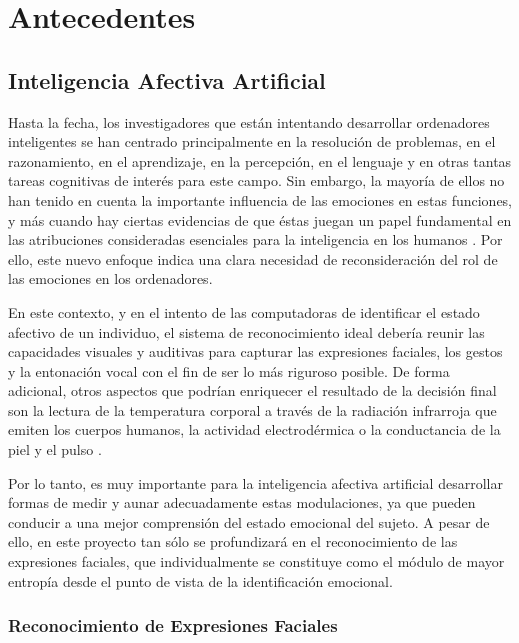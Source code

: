 \chapter{Antecedentes} \label{Chapter:2}

\section{Inteligencia Afectiva Artificial}

Hasta la fecha, los investigadores que están intentando desarrollar ordenadores inteligentes se han centrado principalmente en la resolución de problemas, en el razonamiento, en el aprendizaje, en la percepción, en el lenguaje y en otras tantas tareas cognitivas de interés para este campo. Sin embargo, la mayoría de ellos no han tenido en cuenta la importante influencia de las emociones en estas funciones, y más cuando hay ciertas evidencias de que éstas juegan un papel fundamental en las atribuciones consideradas esenciales para la inteligencia en los humanos \cite{EmotionalIntelligence}. Por ello, este nuevo enfoque indica una clara necesidad de reconsideración del rol de las emociones en los ordenadores.

En este contexto, y en el intento de las computadoras de identificar el estado afectivo de un individuo, el sistema de reconocimiento ideal debería reunir las capacidades visuales y auditivas para capturar las expresiones faciales, los gestos y la entonación vocal con el fin de ser lo más riguroso posible. De forma adicional, otros aspectos que podrían enriquecer el resultado de la decisión final son la lectura de la temperatura corporal a través de la radiación infrarroja que emiten los cuerpos humanos, la actividad electrodérmica o la conductancia de la piel y el pulso \cite{Biosignals}.

Por lo tanto, es muy importante para la inteligencia afectiva artificial desarrollar formas de medir y aunar adecuadamente estas modulaciones, ya que pueden conducir a una mejor comprensión del estado emocional del sujeto. A pesar de ello, en este proyecto tan sólo se profundizará en el reconocimiento de las expresiones faciales, que individualmente se constituye como el módulo de mayor entropía desde el punto de vista de la identificación emocional.

\subsection{Reconocimiento de Expresiones Faciales}

